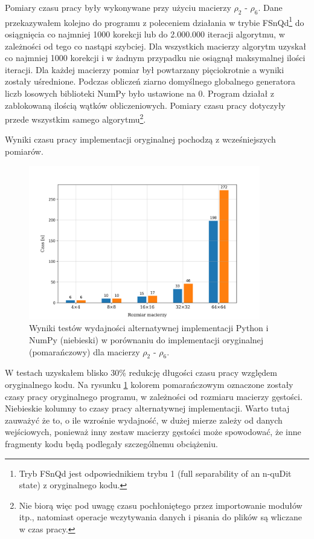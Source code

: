 \documentclass[10pt, a4paper]{article}
\begin{document}
\begin{sloppypar}
    Pomiary czasu pracy były wykonywane przy użyciu macierzy $\rho_{2}$ - $\rho_{6}$.
    Dane przekazywałem kolejno do programu z poleceniem działania w trybie FSnQd\footnote{Tryb
    FSnQd jest odpowiednikiem trybu 1 (full separability of an n-quDit state) z oryginalnego
    kodu.} do osiągnięcia co najmniej 1000 korekcji lub do 2.000.000 iteracji algorytmu,
    w zależności od tego co nastąpi szybciej. Dla wszystkich macierzy algorytm uzyskał
    co najmniej 1000 korekcji i w żadnym przypadku nie osiągnął maksymalnej ilości
    iteracji. Dla każdej macierzy pomiar był powtarzany pięciokrotnie a wyniki zostały uśrednione.
    Podczas obliczeń ziarno domyślnego globalnego generatora liczb losowych biblioteki
    NumPy było ustawione na 0. Program działał z zablokowaną ilością wątków
    obliczeniowych. Pomiary czasu pracy dotyczyły przede wszystkim samego algorytmu\footnote{Nie
    biorą więc pod uwagę czasu pochłoniętego przez importowanie modułów itp., natomiast
    operacje wczytywania danych i pisania do plików są wliczane w czas pracy.}.

    Wyniki czasu pracy implementacji oryginalnej pochodzą z wcześniejszych pomiarów.

    \FloatBarrier
    \begin{figure}[ht]
      \centering
      \includegraphics[width=0.9\textwidth]{"resources/benchmark_2/plot.png"}
      \caption{Wyniki testów wydajności alternatywnej implementacji Python i NumPy (niebieski) w porównaniu do implementacji oryginalnej (pomarańczowy) dla macierzy $\rho
      _{2}$ - $\rho_{6}$.}
      \label{first-perf}
    \end{figure}
    \FloatBarrier

    W testach uzyskałem blisko 30\% redukcję długości czasu pracy względem oryginalnego
    kodu. Na rysunku \ref{first-perf} kolorem pomarańczowym oznaczone zostały czasy pracy
    oryginalnego programu, w zależności od rozmiaru macierzy gęstości. Niebieskie kolumny
    to czasy pracy alternatywnej implementacji. Warto tutaj zauważyć że to, o ile wzrośnie
    wydajność, w dużej mierze zależy od danych wejściowych, ponieważ inny zestaw macierzy
    gęstości może spowodować, że inne fragmenty kodu będą podlegały szczególnemu
    obciążeniu.


\end{sloppypar}
\end{document}
